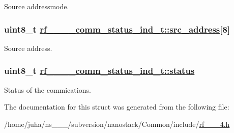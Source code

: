 Source addressmode. \hypertarget{structrf__802__15__4__comm__status__ind__t_3d8825053b35dbb8ee9ea4fbd2226423}{
\subsubsection[src\_\-address]{\setlength{\rightskip}{0pt plus 5cm}uint8\_\-t \hyperlink{structrf__802__15__4__comm__status__ind__t_3d8825053b35dbb8ee9ea4fbd2226423}{rf\_\_\_\_\-comm\_\-status\_\-ind\_\-t::src\_\-address}\mbox{[}8\mbox{]}}}
\label{structrf__802__15__4__comm__status__ind__t_3d8825053b35dbb8ee9ea4fbd2226423}


Source address. \hypertarget{structrf__802__15__4__comm__status__ind__t_674eed88c71b40a8df8b93af54cb8ad0}{
\subsubsection[status]{\setlength{\rightskip}{0pt plus 5cm}uint8\_\-t \hyperlink{structrf__802__15__4__comm__status__ind__t_674eed88c71b40a8df8b93af54cb8ad0}{rf\_\_\_\_\-comm\_\-status\_\-ind\_\-t::status}}}
\label{structrf__802__15__4__comm__status__ind__t_674eed88c71b40a8df8b93af54cb8ad0}


Status of the commications. 

The documentation for this struct was generated from the following file:\begin{CompactItemize}
\item 
/home/juha/ns\_\_\_/subversion/nanostack/Common/include/\hyperlink{rf__802__15__4_8h}{rf\_\_\_\-4.h}\end{CompactItemize}
